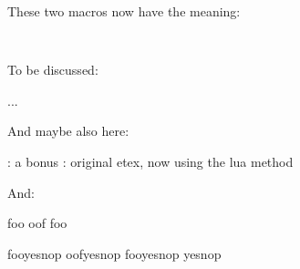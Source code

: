 These two macros now have the meaning:

\startlines \tt
\meaning\MyMacroA
\meaning\MyMacroB
\stoplines

\stopsection

\startsection[title={\LUAMETATEX\ primitives}]

To be discussed:

\starttyping
\expand
\expandtoken
\localcontrol
\localcontrolled
\beginlocalcontrol ... \endlocalcontrol
\immediate
\stoptyping

And maybe also here:

\starttyping
\tokenized  : a bonus
\scantokens : original etex, now using the lua method
\stoptyping


And:

\starttyping
          \def\foo{foo}
\protected{}

\csname foo\endcsname
\csname oof\endcsname
\csname \foo\endcsname

\ifcsname  foo\endcsname yes\else nop\fi
\ifcsname  oof\endcsname yes\else nop\fi
\ifcsname \foo\endcsname yes\else nop\fi
\ifcsname \oof\endcsname yes\else nop\fi %
\stoptyping

\stoptext

\stopsection

\stopdocument

